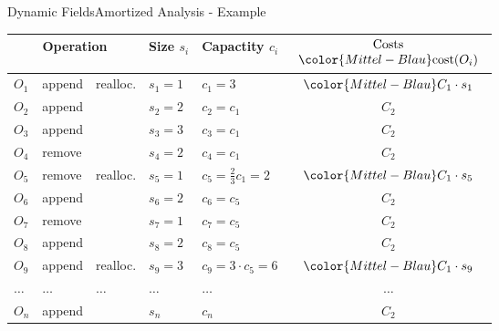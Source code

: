 \begin{frame}{Dynamic Fields}{Amortized Analysis - Example}
  \vspace*{-1.0em}
  \begin{table}[!h]
    \label{tab:amortized_analysis_introduction}%
    \begin{tabular}{|l|l|l|l|l|c|}
      \bottomrule
      \multicolumn{3}{|c|}{Operation} &
      Size {\color{Mittel-Blau}$s_i$} &
      Capactity {\color{Mittel-Blau}$c_i$} &
      $\begin{array}{c}
        \text{Costs}\\
        {\color{Mittel-Blau}\mathrm{cost}(O_i)}
      \end{array}$\\
      \toprule
      $O_1$ & append & {\color{Mittel-Blau}realloc.} &
      $s_1 = 1$ & {\color{Mittel-Blau}$c_1 = 3$} &
      ${\color{Mittel-Blau}C_1 \cdot s_1}$\\
      $O_2$ & append & {} &
      $s_2 = 2$ & $c_2 = c_1$ & $C_2$\\
      $O_3$ & append & {} &
      $s_3 = 3$ & $c_3 = c_1$ & $C_2$\\
      $O_4$ & remove & {} &
      $s_4 = 2$ & $c_4 = c_1$ & $C_2$\\
      \midrule
      $O_5$ & remove & {\color{Mittel-Blau}realloc.} &
      $s_5 = 1$ & {\color{Mittel-Blau}$c_5 = \frac{2}{3} c_1 = 2$} &
      ${\color{Mittel-Blau}C_1 \cdot s_5}$\\
      $O_6$ & append & {} &
      $s_6 = 2$ & $c_6 = c_5$ & $C_2$\\
      $O_7$ & remove & {} &
      $s_7 = 1$ & $c_7 = c_5$ & $C_2$\\
      $O_8$ & append & {} &
      $s_8 = 2$ & $c_8 = c_5$ & $C_2$\\
      \midrule
      $O_9$ & append & {\color{Mittel-Blau}realloc.} &
      $s_9 = 3$ & {\color{Mittel-Blau}$c_9 = 3 \cdot c_5 = 6$} &
      ${\color{Mittel-Blau}C_1 \cdot s_9}$\\
      $\dots$ & $\dots$ & $\dots$ & $\dots$ & $\dots$ & $\dots$\\
      $O_n$ & append & {} &
      $s_n$ & $c_n$ & $C_2$\\
      \bottomrule
    \end{tabular}
  \end{table}
\end{frame}


